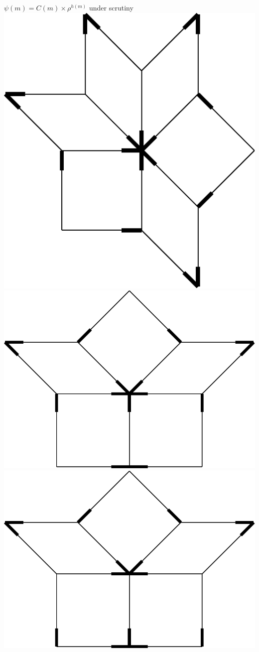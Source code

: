 \documentclass[xcolor=x11names,compress,professionalfonts, aspectratio=169]{beamer}
\renewcommand{\(}{\begin{columns}}
\renewcommand{\)}{\end{columns}}
\newcommand{\<}[1]{\begin{column}{#1}}
\renewcommand{\>}{\end{column}}
\begin{document}
\begin{frame}{$\psi(m) = C(m) \times \rho^{h(m)}$ under scrutiny}
{\includegraphics[scale=\s]{img/env_C.pdf}
\includegraphics[scale=\s]{img/env_D1.pdf}
\includegraphics[scale=\s]{img/env_D2.pdf}
}
\end{frame}
\end{document}
